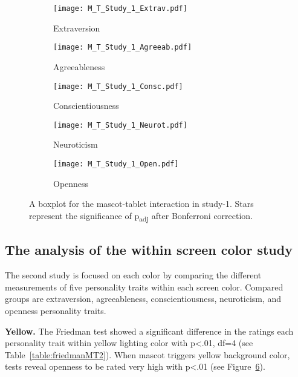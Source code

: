 \begin{figure}[hbt!]
    \centering
    \begin{subfigure}{.40\textwidth}
        \centering
        \texttt{[image: M\_T\_Study\_1\_Extrav.pdf]}
        \caption{Extraversion}
        \label{fig:sub1}
    \end{subfigure}\hfill%
    \begin{subfigure}{.40\textwidth}
        \centering
        \texttt{[image: M\_T\_Study\_1\_Agreeab.pdf]}
        \caption{Agreeableness}
        \label{fig:sub2}
    \end{subfigure}\hfill
    \begin{subfigure}{.40\textwidth}
        \centering
        \texttt{[image: M\_T\_Study\_1\_Consc.pdf]}
        \caption{Conscientiousness}
        \label{fig:sub1}
    \end{subfigure}\hfill%
    \begin{subfigure}{.40\textwidth}
        \centering
        \texttt{[image: M\_T\_Study\_1\_Neurot.pdf]}
        \caption{Neuroticism}
        \label{fig:sub1}
    \end{subfigure}\hfill%
    \begin{subfigure}{.40\textwidth}
        \centering
        \texttt{[image: M\_T\_Study\_1\_Open.pdf]}
        \caption{Openness}
        \label{fig:sub1}
    \end{subfigure}\hfill%
    \caption{A boxplot for the mascot-tablet interaction in study-1.
    Stars represent the significance of p\textsubscript{adj} after Bonferroni correction.}
    \label{fig:MT1}
\end{figure}
\subsection{The analysis of the within screen color study}
\label{subsec:MTstudy2}
The second study is focused on each color by comparing the different measurements of five
personality traits within each screen color.
Compared groups are extraversion, agreeableness, conscientiousness, neuroticism, and openness personality traits.

\par\textbf{Yellow.}
The Friedman test showed a significant difference in the ratings each personality trait
within yellow lighting color with p<.01, df=4 (see Table~\ref{table:friedmanMT2}).
When mascot triggers yellow background color, tests reveal openness
to be rated very high with p<.01 (see Figure~\ref{fig:MT1}).

